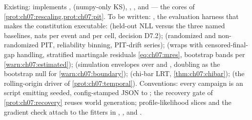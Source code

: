 \begin{codehooks}
Existing:  implements
,  (numpy-only KS),
, , and
 --- the cores of
\cref{prot:ch07:rescaling,prot:ch07:pit}. To be written:
, the evaluation harness that makes the constitution
executable:  (held-out NLL versus the three
named baselines, nats per event and per cell, decision D7.2);
 (randomized and non-randomized PIT, reliability
binning, PIT-drift series);  (wraps
 with censored-final-gap handling, stratified martingale
residuals \cref{eq:ch07:mres}, bootstrap bands per
\cref{warn:ch07:estimated});  (simulation
envelopes over  and
, doubling as the bootstrap null for
\cref{warn:ch07:boundary});  (chi-bar LRT,
\cref{thm:ch07:chibar});  (the rolling-origin
driver of \cref{prot:ch07:temporal}). Conventions: every campaign is an
 script emitting seeded, config-stamped
JSON to ; the recovery gate of \cref{prot:ch07:recovery}
reuses  world generation; profile-likelihood slices and
the gradient check attach to the fitters in
, , and
.
\end{codehooks}
